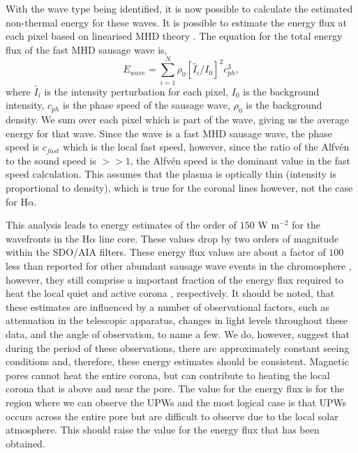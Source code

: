 	With the wave type being identified, it is now possible to calculate the estimated non-thermal energy for these waves.
	It is possible to estimate the energy flux at each pixel based on linearised MHD theory \citep[e.g.][]{Kitagawa2010}.
	The equation for the total energy flux of the fast MHD sausage wave is,
	\begin{equation}
		E_{wave} = \sum\limits_{i = 1}^{N}\rho_{0}[\tilde{I_{i}}/I_{0}]^{2}c_{ph}^{3},
		\label{energy}
	\end{equation}
	where $\tilde{I_{i}}$ is the intensity perturbation for each pixel, $I_{0}$ is the background intensity, $c_{ph}$ is the phase speed of the sausage wave, $\rho_{0}$ is the background density.
	We sum over each pixel which is part of the wave, giving us the average energy for that wave.
	Since the wave is a fast MHD sausage wave, the phase speed is $c_{fast}$ which is the local fast speed, however, since the ratio of the Alfv{\'e}n to the sound speed is $>>1$, the Alfv{\'e}n speed is the dominant value in the fast speed calculation.
	This assumes that the plasma is optically thin (intensity is proportional to density), which is true for the coronal lines however, not the case for H$\alpha$.

	This analysis leads to energy estimates of the order of $150$ W m$^{-2}$ for the wavefronts in the H$\alpha$ line core.
	These values drop by two orders of magnitude within the SDO/AIA filters.
	These energy flux values are about a factor of $100$ less than reported for other abundant sausage wave events in the chromosphere \citep{Morton2012}, however, they still comprise a important fraction of the energy flux required to heat the local quiet \citep{Wedemeyer2012} and active corona \citep{Aschwanden2007}, respectively.
	It should be noted, that these estimates are influenced by a number of observational factors, such as attenuation in the telescopic apparatus, changes in light levels throughout these data, and the angle of observation, to name a few.
	We do, however, suggest that during the period of these observations, there are approximately constant seeing conditions and, therefore, these energy estimates should be consistent.
	Magnetic pores cannot heat the entire corona, but can contribute to heating the local corona that is above and near the pore.
	The value for the energy flux is for the region where we can observe the UPWs and the most logical case is that UPWs occurs across the entire pore but are difficult to observe due to the local solar atmosphere.
	This should raise the value for the energy flux that has been obtained.

